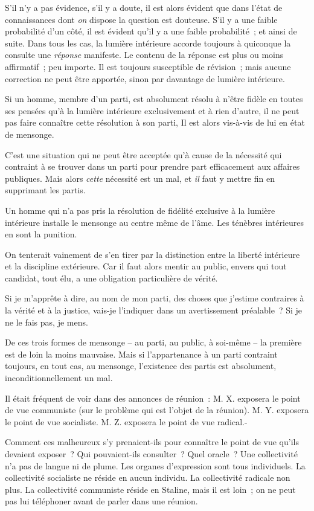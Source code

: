 \documentclass[french,twoside]{book} %
\begin{document}
S’il n’y a pas évidence, s’il y a doute, il est alors évident que dans l’état de connaissances dont \emph{on} dispose la question est douteuse. S’il y a une faible probabilité d’un côté, il est évident qu’il y a une faible probabilité ; et ainsi de suite. Dans tous les cas, la lumière intérieure accorde toujours à quiconque la consulte une \emph{réponse} manifeste. Le contenu de la réponse est plus ou moins affirmatif ; peu importe. Il est toujours susceptible de révision ; mais aucune correction ne peut être apportée, sinon par davantage de lumière intérieure.\par
Si un homme, membre d’un parti, est absolument résolu à n’être fidèle en toutes ses pensées qu’à la lumière intérieure exclusivement et à rien d’autre, il ne peut pas faire connaître cette résolution à son parti, Il est alors vis-à-vis de lui en état de mensonge.\par
C’est une situation qui ne peut être acceptée qu’à cause de la nécessité qui contraint à se trouver dans un parti pour prendre part efficacement aux affaires publiques. Mais alors \emph{cette} nécessité est un mal, et \emph{il} faut y mettre fin en supprimant les partis.\par
Un homme qui n’a pas pris la résolution de fidélité exclusive à la lumière intérieure installe le mensonge au centre même de l’âme. Les ténèbres intérieures en sont la punition.\par
On tenterait vainement de s’en tirer par la distinction entre la liberté intérieure et la discipline extérieure. Car il faut alors mentir au public, envers qui tout candidat, tout élu, a une obligation particulière de vérité.\par
Si je m’apprête à dire, au nom de mon parti, des choses que j’estime contraires à la vérité et à la justice, vais-je l’indiquer dans un avertissement préalable ? Si je ne le fais pas, je mens.\par
De ces trois formes de mensonge – au parti, au public, à soi-même – la première est de loin la moins mauvaise. Mais si l’appartenance à un parti contraint toujours, en tout cas, au mensonge, l’existence des partis est absolument, inconditionnellement un mal.\par
Il était fréquent de voir dans des annonces de réunion : M. X. exposera le point de vue communiste (sur le problème qui est l’objet de la réunion). M. Y. exposera le point de vue socialiste. M. Z. exposera le point de vue radical.-\par
Comment ces malheureux s’y prenaient-ils pour connaître le point de vue qu’ils devaient exposer ? Qui pouvaient-ils consulter ? Quel oracle ? Une collectivité n’a pas de langue ni de plume. Les organes d’expression sont tous individuels. La collectivité socialiste ne réside en aucun individu. La collectivité radicale non plus. La collectivité communiste réside en Staline, mais il est loin ; on ne peut pas lui téléphoner avant de parler dans une réunion.\par
\end{document}

